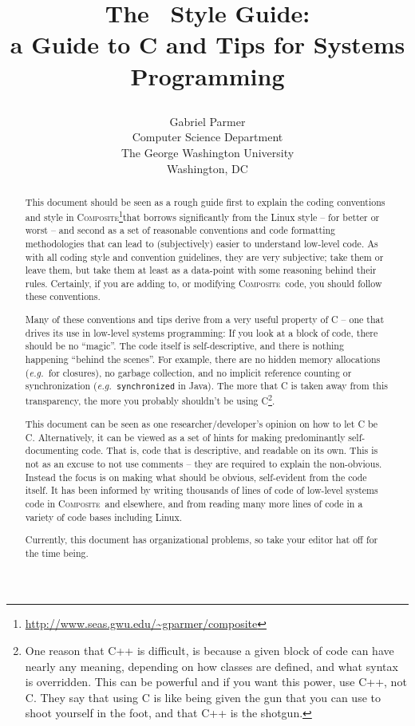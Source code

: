 \documentclass[11pt,onecolumn]{article}
\date{}
\title{\Large\bf The \composite\ Style Guide: \\
a Guide to C and Tips for Systems Programming\\
\author{Gabriel Parmer\\[0.05in]
Computer Science Department \\
The George Washington University\\
Washington, DC
}}
\def\composite{\textsc{Composite}}
\def\eg{\textit{e.g.}}
\begin{document}
\thispagestyle{empty}
\maketitle
\thispagestyle{empty}


%

%

  
\begin{abstract}
  This document should be seen as a rough guide first to explain the
  coding conventions and style in
  \composite\footnote{\url{http://www.seas.gwu.edu/~gparmer/composite}}that
  borrows significantly from the Linux style -- for better or worst --
  and second as a set of reasonable conventions and code formatting
  methodologies that can lead to (subjectively) easier to understand
  low-level code.  As with all coding style and convention guidelines,
  they are very subjective; take them or leave them, but take them at
  least as a data-point with some reasoning behind their rules.
  Certainly, if you are adding to, or modifying \composite\ code, you
  should follow these conventions.

  Many of these conventions and tips derive from a very useful
  property of C -- one that drives its use in low-level systems
  programming: If you look at a block of code, there should be no
  ``magic''.  The code itself is self-descriptive, and there is
  nothing happening ``behind the scenes''.  For example, there are no
  hidden memory allocations (\eg\ for closures), no garbage
  collection, and no implicit reference counting or synchronization
  (\eg\ {\tt synchronized} in Java).  The more that C is taken away
  from this transparency, the more you probably shouldn't be using
  C\footnote{One reason that C++ is difficult, is because a given
    block of code can have nearly any meaning, depending on how
    classes are defined, and what syntax is overridden.  This can be
    powerful and if you want this power, use C++, not C.  They say
    that using C is like being given the gun that you can use to shoot
    yourself in the foot, and that C++ is the shotgun.}.

  This document can be seen as one researcher/developer's opinion on
  how to let C be C.  Alternatively, it can be viewed as a set of
  hints for making predominantly self-documenting code.  That is, code
  that is descriptive, and readable on its own.  This is not as an
  excuse to not use comments -- they are required to explain the
  non-obvious.  Instead the focus is on making what should be obvious,
  self-evident from the code itself.  It has been informed by writing
  thousands of lines of code of low-level systems code in
  \composite\ and elsewhere, and from reading many more lines of code
  in a variety of code bases including Linux.

  Currently, this document has organizational problems, so take your
  editor hat off for the time being.
\end{abstract}
\end{document}
